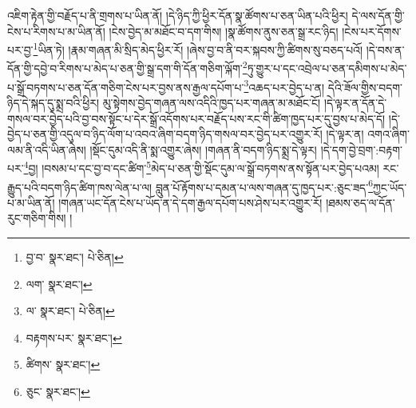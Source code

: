 འཇིག་རྟེན་གྱི་བརྗོད་པ་ནི་གྲགས་པ་ཡིན་ནོ། །དེ་ཉིད་ཀྱི་ཕྱིར་དོན་སྣ་ཚོགས་པ་ཅན་ཡིན་པའི་ཕྱིར། དེ་ལས་དོན་གྱི་ངེས་པ་རིགས་པ་མ་ཡིན་ནོ། །ངེས་བྱེད་མ་མཐོང་བ་དག་གིས། །སྣ་ཚོགས་ནུས་ཅན་སྒྲ་རང་ཉིད། །ངེས་པར་དོགས་པར་བྱ་\footnote{བྱ་བ་  སྣར་ཐང་།  པེ་ཅིན། }ཡིན་ཏེ། །རྣམ་གཞན་མི་སྲིད་མེད་ཕྱིར་རོ། །ཞེས་བྱ་བ་ནི་བར་སྐབས་ཀྱི་ཚིགས་སུ་བཅད་པའོ། །དེ་བས་ན་དོན་གྱི་དབྱེ་བ་རིགས་པ་མེད་པ་ཅན་གྱི་སྒྲ་དག་གི་དོན་གཅིག་ལྐོག་\footnote{ལག་  སྣར་ཐང་། }ཏུ་གྱུར་པ་དང་འབྲེལ་པ་ཅན་དམིགས་པ་མེད་པ་སྒྲོ་བཏགས་པ་ཅན་དོན་གཅིག་ངེས་པར་བྱས་ནས་རྒྱལ་དཔོག་པ་\footnote{ལ་  སྣར་ཐང་།  པེ་ཅིན། }འཆད་པར་བྱེད་པ་ན། དེའི་ཟོལ་གྱིས་བདག་ཉིད་དེ་སྐད་དུ་སྨྲ་བའི་ཕྱིར། མུ་སྟེགས་བྱེད་གཞན་ལས་འདིའི་ཁྱད་པར་གཞན་མ་མཐོང་ངོ། །དེ་ལྟར་ན་དོན་དེ་གསལ་བར་བྱེད་པའི་བྱ་བས་སྟོང་པ་དེར་སྒྲོ་འདོགས་པར་བརྗོད་པས་རང་གི་ཚིག་ཁྱད་པར་དུ་བྱས་པ་མེད་དོ། །དེ་བྱེད་པ་ཅན་གྱི་འདུལ་བ་ཉིད་ལོག་པ་འབའ་ཞིག་བདག་ཉིད་གསལ་བར་བྱེད་པར་འགྱུར་རོ། །དེ་ལྟར་ན། འགའ་ཞིག་ལམ་ནི་འདི་ཡིན་ཞེས། །སྡོང་དུམ་འདི་ནི་སྨ་འགྱུར་ཞེས། །གཞན་ནི་བདག་ཉིད་སྨྲ་དེ་ལྟར། །དེ་དག་བྱེ་བྲག་:བརྟག་པར་\footnote{བརྟགས་པར་  སྣར་ཐང་། }བྱ། །བསམ་པ་དང་བྱ་བ་དང་ཚིག་\footnote{ཚིགས་  སྣར་ཐང་། }མེད་པ་ཅན་གྱི་སྡོང་དུམ་ལ་སྒྲོ་བཏགས་ནས་སྟོན་པར་བྱེད་པའམ། རང་རྒྱུད་པའི་བདག་ཉིད་ཚིག་ཁས་ལེན་པ་ལ། བླུན་པོ་རྟོགས་པ་དམན་པ་ལས་གཞན་དུ་ཁྱད་པར་:ཅུང་ཟད་\footnote{ཅུང་  སྣར་ཐང་། }ཀྱང་ཡོད་པ་མ་ཡིན་ནོ། །གཞན་ཡང་དོན་ངེས་པ་ཡོད་ན་དེ་དག་རྒྱལ་དཔོག་པས་ཤེས་པར་འགྱུར་རོ། །ཐམས་ཅད་ལ་དོན་རུང་གཅིག་གིས། །
